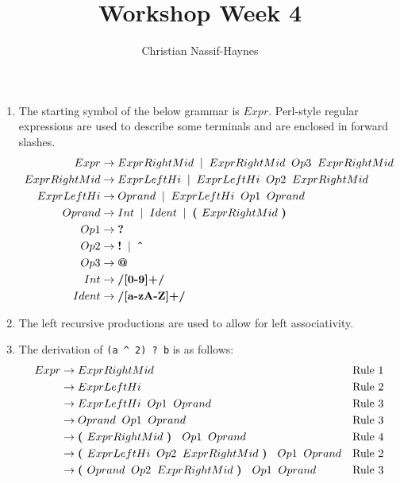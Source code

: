 \documentclass[a4paper]{article}
\begin{document}
	\title{Workshop Week 4}
	\author{Christian Nassif-Haynes}
	\maketitle

	\begin{enumerate}
		\item The starting symbol of the below grammar is $Expr$. Perl-style regular expressions are used to describe some terminals and are enclosed in forward slashes.
		\begin{align}
			Expr			&\rightarrow ExprRightMid \;\;|\;\; ExprRightMid \;\; Op3 \;\; ExprRightMid \\
			ExprRightMid	&\rightarrow ExprLeftHi \;\;|\;\; ExprLeftHi \;\; Op2 \;\; ExprRightMid \\
			ExprLeftHi		&\rightarrow Oprand \;\;|\;\; ExprLeftHi \;\; Op1 \;\; Oprand  \\
			Oprand			&\rightarrow Int \;\;|\;\; Ident \;\;|\;\; \text{\bf ( } ExprRightMid \text{ \bf ) } \\
			Op1				&\rightarrow \text{\bf ?} \\
			Op2				&\rightarrow \text{\bf !} \;\;|\;\; \text{\bf \^\null} \\
			Op3				&\rightarrow \text{\bf @} \\
			Int				&\rightarrow \text{\bf/{[}0-9{]}+/} \\
			Ident			&\rightarrow \text{\bf/{[}a-zA-Z{]}+/}
		\end{align}
		\item The left recursive productions are used to allow for left associativity.
		\item The derivation of \verb|(a ^ 2) ? b| is as follows:
		\begin{align*}
			Expr &\rightarrow ExprRightMid & \text{Rule 1} \\
				 &\rightarrow ExprLeftHi & \text{Rule 2} \\
				 &\rightarrow ExprLeftHi \;\; Op1 \;\; Oprand & \text{Rule 3} \\
				 &\rightarrow Oprand \;\; Op1 \;\; Oprand & \text{Rule 3} \\
				 &\rightarrow \text{\bf ( } ExprRightMid \text{ \bf ) } \;\; Op1 \;\; Oprand & \text{Rule 4} \\
				 &\rightarrow \text{\bf ( } ExprLeftHi \;\; Op2 \;\; ExprRightMid \text{ \bf ) } \;\; Op1 \;\; Oprand & \text{Rule 2} \\
				 &\rightarrow \text{\bf ( } Oprand \;\; Op2 \;\; ExprRightMid \text{ \bf ) } \;\; Op1 \;\; Oprand & \text{Rule 3} \\

\end{align*}
\end{enumerate}
\end{document}
